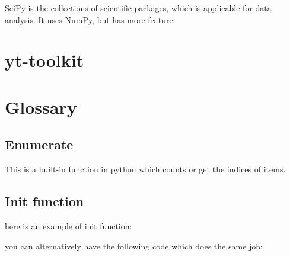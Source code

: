 \documentclass[10pt,a4paper]{article}
\begin{document}
SciPy is the collections of scientific packages, which is applicable for data analysis. It uses NumPy, but has more feature.




















\section{yt-toolkit}


























\section{Glossary}


\subsection{Enumerate}
\label{enumerate}
This is a built-in function in python which counts or get the indices  of items.



\subsection{Init function}
\label{subsec:init}
here is an example of init function:

you can alternatively have the following code which does the same job:

\end{document}
